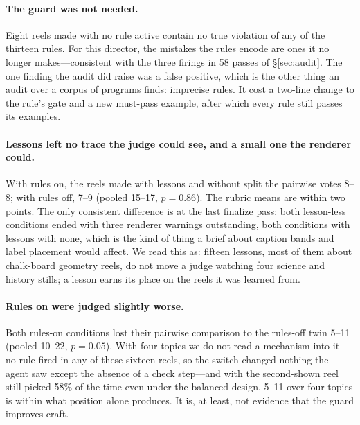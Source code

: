 \documentclass[11pt]{article}
\begin{document}
\paragraph{The guard was not needed.} Eight reels made with no rule active contain no true violation
of any of the thirteen rules. For this director, the mistakes the rules encode are ones it no longer
makes---consistent with the three firings in 58 passes of \S\ref{sec:audit}. The one finding the audit
did raise was a false positive, which is the other thing an audit over a corpus of programs finds:
imprecise rules. It cost a two-line change to the rule's gate and a new must-pass example, after which
every rule still passes its examples.

\paragraph{Lessons left no trace the judge could see, and a small one the renderer could.} With rules
on, the reels made with lessons and without split the pairwise votes 8--8; with rules off, 7--9
(pooled 15--17, $p=0.86$). The
rubric means are within two points. The only consistent difference is at the last finalize pass: both
lesson-less conditions ended with three renderer warnings outstanding, both conditions with lessons
with none, which is the kind of thing a brief about caption bands and label placement would affect.
We read this as: fifteen lessons, most of them about chalk-board geometry reels, do not move a judge
watching four science and history stills; a lesson earns its place on the reels it was learned from.

\paragraph{Rules on were judged slightly worse.} Both rules-on conditions lost their pairwise
comparison to the rules-off twin 5--11 (pooled 10--22, $p=0.05$). With four topics we do not read a mechanism into it---no
rule fired in any of these sixteen reels, so the switch changed nothing the agent saw except the
absence of a check step---and with the second-shown reel still picked 58\% of the time even under the
balanced design, 5--11 over four topics is within what position alone produces. It is, at least, not
evidence that the guard improves craft.
\end{document}

